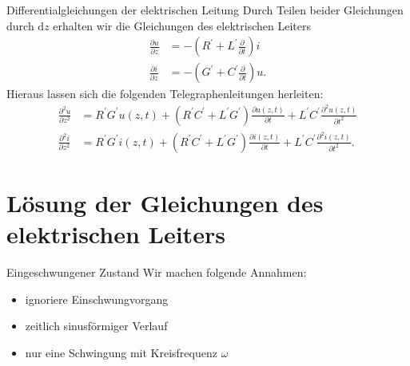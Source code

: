 \documentclass{beamer}
\begin{document}
\begin{frame}{Differentialgleichungen der elektrischen Leitung}
Durch Teilen beider Gleichungen durch $\mathrm{d}z$ erhalten wir die \alert{Gleichungen des elektrischen Leiters}
\begin{align}
    \frac{\partial u}{\partial z} &= -\left(R^{\prime} + L^{\prime}\frac{\partial}{\partial t}\right)i \label{eq:Dgl1}
    \\[1ex]
    \frac{\partial i}{\partial z} &= -\left(G^{\prime} + C^{\prime}\frac{\partial}{\partial t}\right)u. \label{eq:Dgl2}
\end{align}
Hieraus lassen sich die folgenden \alert{Telegraphenleitungen} herleiten:
\begin{align}
    \frac{\partial^{2} u}{\partial z^{2}} &= R^{\prime} G^{\prime} u(z,t) + (R^{\prime} C^{\prime} + L^{\prime}
    G^{\prime}) \frac{\partial u(z, t)}{\partial t} + L^{\prime} C^{\prime} \frac{\partial^{2} u(z,t)}{\partial t^{2}}
    \label{eq:Tele1} \\[1.5ex]
    \frac{\partial^{2} i}{\partial z^{2}} &= R^{\prime} G^{\prime} i(z,t) + (R^{\prime} C^{\prime} + L^{\prime}
    G^{\prime}) \frac{\partial i(z, t)}{\partial t} + L^{\prime} C^{\prime} \frac{\partial^{2} i(z, t)}{\partial t^{2}}.
\end{align}

\end{frame}


\section{Lösung der Gleichungen des elektrischen Leiters}


\begin{frame}{Eingeschwungener Zustand}
Wir machen folgende Annahmen:
\begin{itemize}
    \item<1-> ignoriere Einschwungvorgang
    \item<2-> zeitlich sinusförmiger Verlauf
    \item<3-> nur eine Schwingung mit Kreisfrequenz $\omega$
\end{itemize}

\vspace*{1em}

\end{frame}
\end{document}
